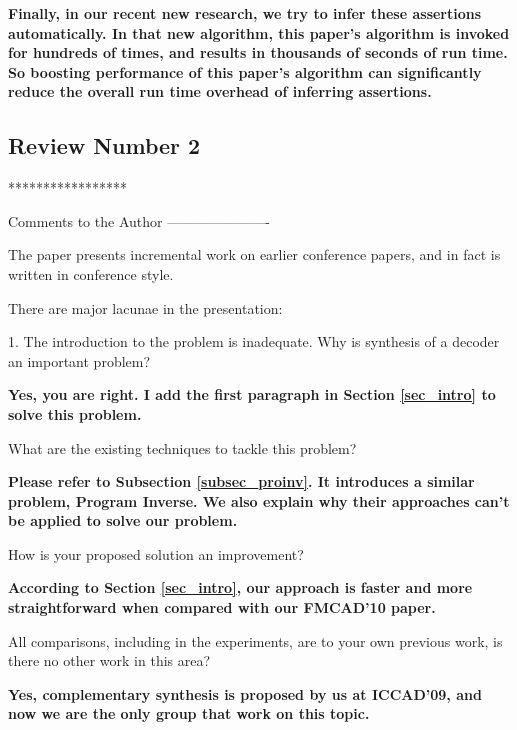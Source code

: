 \documentclass[journal]{IEEEtran}
\begin{document}
\textbf{
Finally,
in our recent new research,
we try to infer these assertions automatically.
In that new algorithm,
this paper's algorithm is invoked for hundreds of times,
and results in thousands of seconds of run time.
So boosting performance of this paper's algorithm can significantly reduce the overall run time overhead of inferring assertions.
}

\bigskip






\subsection{Review Number 2}
*****************

Comments to the Author
----------------------

The paper presents incremental work on earlier conference papers, and in fact is written in conference style.

There are major lacunae in the presentation:

1. The introduction to the problem is inadequate. Why is synthesis of a decoder an important problem?

\smallskip

\textbf{Yes,
you are right.
I add the first paragraph in Section \ref{sec_intro} to solve this problem.}

\bigskip

What are the existing techniques to tackle this problem?

\smallskip

\textbf{Please refer to Subsection \ref{subsec_proinv}.
It introduces a similar problem, Program Inverse.
We also explain why their approaches can't be applied to solve our problem.}

\bigskip

How is your proposed solution an improvement?

\textbf{According to Section \ref{sec_intro},
our approach is faster and more straightforward when compared with our FMCAD'10 paper\cite{ShengYuShen:fmcad10}.}

\bigskip


All comparisons, including in the experiments, are to your own previous work, is there no other work in this area?

\smallskip

\textbf{Yes, complementary synthesis is proposed by us at ICCAD'09,
and now we are the only group that work on this topic.}
\end{document}
